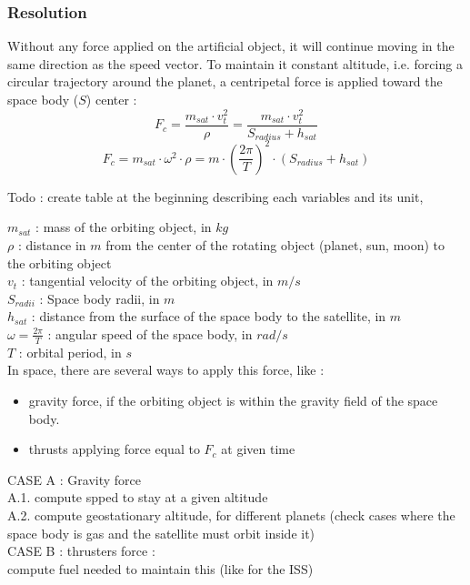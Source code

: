\documentclass[12pt,a4paper]{article}
\begin{document}
\subsubsection{Resolution}
Without any force applied on the artificial object, it will continue moving in the same direction as the speed vector. To maintain it constant altitude, i.e. forcing a circular trajectory around the planet, a centripetal force is applied toward the space body ($S$) center : 
\begin{equation}
	F_c = \frac{m_{sat} \cdot v_t^2}{\rho} = \frac{m_{sat} \cdot v_t^2}{S_{radius} + h_{sat}}
\end{equation}
\begin{equation}
	F_c = m_{sat} \cdot \omega^2 \cdot \rho= m \cdot (\frac{2 \pi}{T})^2 \cdot (S_{radius} + h_{sat})
\end{equation}

Todo : create table at the beginning describing each variables and its unit, 

$m_{sat}$ : mass of the orbiting object, in $kg$\\
$\rho$ : distance in $m$ from the center of the rotating object (planet, sun, moon) to the orbiting object\\
$v_t$ : tangential velocity of the orbiting object, in $m/s$\\
$S_{radii}$ : Space body radii, in $m$\\
$h_{sat}$ : distance from the surface of the space body to the satellite, in $m$\\
$\omega = \frac{2 \pi}{T}$ : angular speed of the space body, in $rad/s$\\
$T$ : orbital period, in $s$\\

In space, there are several ways to apply this force, like : 
\begin{itemize}
	\item gravity force, if the orbiting object is within the gravity field of the space body.
	\item thrusts applying force equal to $F_c$ at given time
\end{itemize}

CASE A : Gravity force\\
A.1. compute spped to stay at a given altitude\\
A.2. compute geostationary altitude, for different planets (check cases where the space body is gas and the satellite must orbit inside it)\\
CASE B : thrusters force : \\
compute fuel needed to maintain this (like for the ISS)
\end{document}
